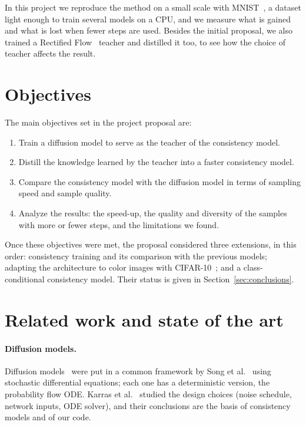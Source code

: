 \documentclass{article}
\begin{document}
In this project we reproduce the method on a small scale with
MNIST~\cite{lecun1998mnist}, a dataset light enough to train several models on
a CPU, and we measure what is gained and what is lost when fewer steps are
used. Besides the initial proposal, we also trained a Rectified
Flow~\cite{liu2023flow} teacher and distilled it too, to see how the choice of
teacher affects the result.

\section{Objectives}
\label{sec:objectives}

The main objectives set in the project proposal are:
\begin{enumerate}
  \item Train a diffusion model to serve as the teacher of the consistency
        model.
  \item Distill the knowledge learned by the teacher into a faster
        consistency model.
  \item Compare the consistency model with the diffusion model in terms of
        sampling speed and sample quality.
  \item Analyze the results: the speed-up, the quality and diversity of the
        samples with more or fewer steps, and the limitations we found.
\end{enumerate}
Once these objectives were met, the proposal considered three extensions, in
this order: consistency training and its comparison with the previous models;
adapting the architecture to color images with
CIFAR-10~\cite{krizhevsky2009cifar}; and a class-conditional consistency
model. Their status is given in Section~\ref{sec:conclusions}.

\section{Related work and state of the art}
\label{sec:related}

\paragraph{Diffusion models.} Diffusion
models~\cite{sohldickstein2015,ho2020ddpm,song2019ncsn} were put in a common
framework by Song et al.~\cite{song2021sde} using stochastic differential
equations; each one has a deterministic version, the probability flow ODE.
Karras et al.~\cite{karras2022edm} studied the design choices (noise schedule,
network inputs, ODE solver), and their conclusions are the basis of consistency
models and of our code.
\end{document}
